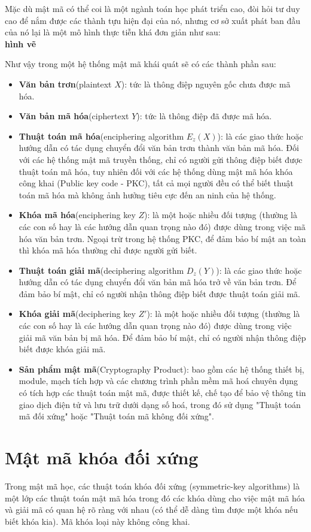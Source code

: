 \documentclass[a4paper,12pt]{report}
\begin{document}
Mặc dù mật mã có thể coi là một ngành toán học phát triển cao, đòi hỏi tư duy cao để nắm được các thành tựu hiện đại của nó, nhưng cơ sở xuất phát ban đầu của nó lại là một mô hình thực tiễn khá đơn giản như sau:\\
\textbf{hình vẽ}

Như vậy trong một hệ thống mật mã khái quát sẽ có các thành phần sau:
\begin{itemize}
\item \textbf{Văn bản trơn}(plaintext $X$): tức là thông điệp nguyên gốc chưa được mã hóa.
\item \textbf{Văn bản mã hóa}(ciphertext $Y$): tức là thông điệp đã được mã hóa.
\item \textbf{Thuật toán mã hóa}(enciphering algorithm $E_z(X)$): là các giao thức hoặc hướng dẫn có tác dụng chuyển đổi văn bản trơn thành văn bản mã hóa. Đối với các hệ thống mật mã truyền thống, chỉ có người gửi thông điệp biết được thuật toán mã hóa, tuy nhiên đối với các hệ thống dùng mật mã hóa khóa công khai (Public key code - PKC), tất cả mọi người đều có thể biết thuật toán mã hóa mà không ảnh hưởng tiêu cực đến an ninh của hệ thống.
\item \textbf{Khóa mã hóa}(enciphering key $Z$): là một hoặc nhiều đối tượng (thường là các con số hay là các hướng dẫn quan trọng nào đó) được dùng trong việc mã hóa văn bản trơn. Ngoại trừ trong hệ thống PKC, để đảm bảo bí mật an toàn thì khóa mã hóa thường chỉ được người gửi biết.
\item \textbf{Thuật toán giải mã}(deciphering algorithm $D_z(Y)$): là các giao thức hoặc hướng dẫn có tác dụng chuyển đổi văn bản mã hóa trở về văn bản trơn. Để đảm bảo bí mật, chỉ có người nhận thông điệp biết được thuật toán giải mã.
\item  \textbf{Khóa giải mã}(deciphering key $Z'$): là một hoặc nhiều đối tượng (thường là các con số hay là các hướng dẫn quan trọng nào đó) được dùng trong việc giải mã văn bản bị mã hóa. Để đảm bảo bí mật, chỉ có người nhận thông điệp biết được khóa giải mã.
\item \textbf{Sản phẩm mật mã}(Cryptography Product): bao gồm các hệ thống thiết bị, module, mạch tích hợp và các chương trình phần mềm mã hoá chuyên dụng có tích hợp các thuật toán mật mã, được thiết kế, chế tạo để bảo vệ thông tin giao dịch điện tử và lưu trữ dưới dạng số hoá, trong đó sử dụng "Thuật toán mã đối xứng" hoặc "Thuật toán mã không đối xứng".
\end{itemize}
\section{Mật mã khóa đối xứng}
Trong mật mã học, các thuật toán khóa đối xứng (symmetric-key algorithms) là một lớp các thuật toán mật mã hóa trong đó các khóa dùng cho việc mật mã hóa và giải mã có quan hệ rõ ràng với nhau (có thể dễ dàng tìm được một khóa nếu biết khóa kia). Mã khóa loại này không công khai.
\end{document}

